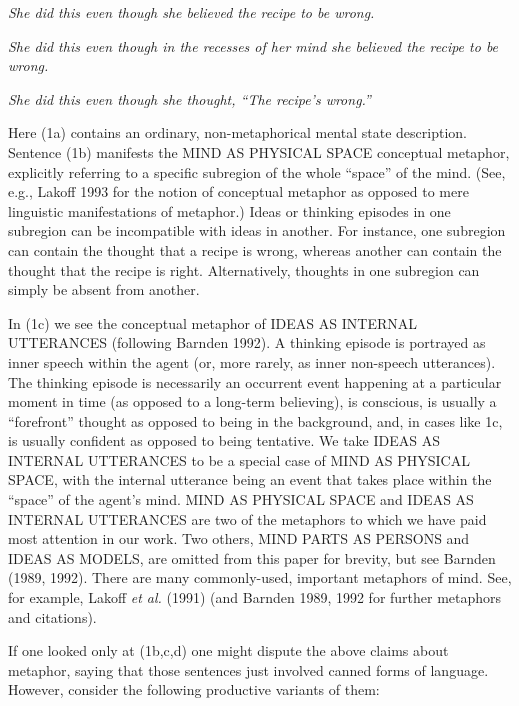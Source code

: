 \addtolength{\baselineskip}{+.6\baselineskip}

{\it She did this even though she believed the recipe to be wrong.}

{\it She did this even though in the recesses of her mind she believed the
recipe to be wrong.}

{\it She did this even though she thought, ``The recipe's wrong.''}

\noindent
Here (1a) contains an ordinary, non-metaphorical mental state
description.  Sentence (1b) manifests the MIND AS PHYSICAL SPACE conceptual
metaphor, explicitly referring to a specific subregion of the whole ``space''
of the mind. (See, e.g., Lakoff 1993 for the notion of conceptual metaphor as
opposed to mere linguistic manifestations of metaphor.)  Ideas or thinking
episodes in one subregion can be incompatible with ideas in another.  For
instance, one subregion can contain the thought that a recipe is wrong, whereas
another can contain the thought that the recipe is right.  Alternatively,
thoughts in one subregion can simply be absent from another.

In (1c) we see the conceptual metaphor of IDEAS AS INTERNAL UTTERANCES
(following Barnden 1992).  A thinking episode is portrayed as inner speech
within the agent (or, more rarely, as inner non-speech utterances).  The
thinking episode is necessarily an occurrent event happening at a particular
moment in time (as opposed to a long-term believing), is conscious, is usually
a ``forefront'' thought as opposed to being in the background, and, in cases
like 1c, is usually confident as opposed to being tentative.  We take IDEAS AS
INTERNAL UTTERANCES to be a special case of MIND AS PHYSICAL SPACE, with the
internal utterance being an event that takes place within the ``space'' of the
agent's mind.  MIND AS PHYSICAL SPACE and IDEAS AS INTERNAL UTTERANCES are two
of the metaphors to which we have paid most attention in our work. Two others,
MIND PARTS AS PERSONS and IDEAS AS MODELS, are omitted from this paper for
brevity, but see Barnden (1989, 1992). There are many commonly-used, important
metaphors of mind.  See, for example, Lakoff {\it et al.} (1991) (and Barnden
1989, 1992 for further metaphors and citations).


If one looked only at (1b,c,d) one might dispute the above claims about
metaphor, saying that those sentences just involved canned forms of language.
However, consider the following productive variants of them:

